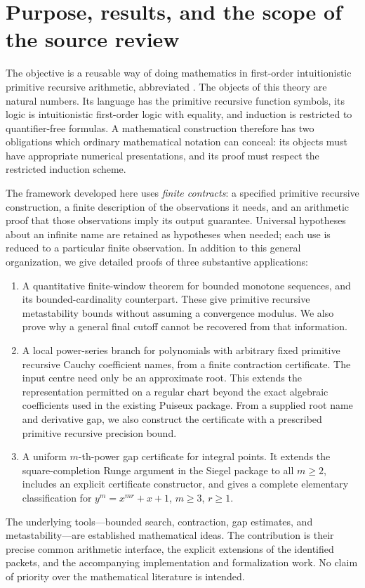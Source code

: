 \section{Purpose, results, and the scope of the source review}
\label{sec:scope}

The objective is a reusable way of doing mathematics in first-order
intuitionistic primitive recursive arithmetic, abbreviated \ipra.  The
objects of this theory are natural numbers.  Its language has the
primitive recursive function symbols, its logic is intuitionistic
first-order logic with equality, and induction is restricted to
quantifier-free formulas.  A mathematical construction therefore has two
obligations which ordinary mathematical notation can conceal: its objects
must have appropriate numerical presentations, and its proof must respect
the restricted induction scheme.

The framework developed here uses \emph{finite contracts}: a specified
primitive recursive construction, a finite description of the observations
it needs, and an arithmetic proof that those observations imply its output
guarantee.  Universal hypotheses about an infinite name are retained as
hypotheses when needed; each use is reduced to a particular finite
observation.  In addition to this general organization, we give detailed
proofs of three substantive applications:
\begin{enumerate}
\item A quantitative finite-window theorem for bounded monotone sequences,
and its bounded-cardinality counterpart.  These give primitive recursive
metastability bounds without assuming a convergence modulus.  We also
prove why a general final cutoff cannot be recovered from that information.
\item A local power-series branch for polynomials with arbitrary fixed
primitive recursive Cauchy coefficient names, from a finite contraction
certificate.  The input centre need only be an approximate root.  This
extends the representation permitted on a regular chart beyond the exact
algebraic coefficients used in the existing Puiseux package.  From a
supplied root name and derivative gap, we also construct the certificate
with a prescribed primitive recursive precision bound.
\item A uniform \(m\)-th-power gap certificate for integral points.  It
extends the square-completion Runge argument in the Siegel package to all
\(m\ge2\), includes an explicit certificate constructor, and gives a
complete elementary classification for
\(y^m=x^{mr}+x+1\), \(m\ge3\), \(r\ge1\).
\end{enumerate}
The underlying tools---bounded search, contraction, gap estimates, and
metastability---are established mathematical ideas.  The contribution is
their precise common arithmetic interface, the explicit extensions of the
identified packets, and the accompanying implementation and formalization
work.  No claim of priority over the mathematical literature is intended.

